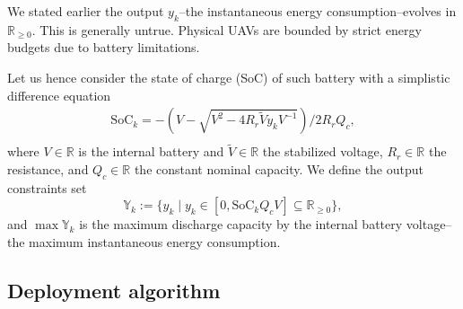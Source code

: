 \documentclass[letterpaper,10pt,conference]{ieeeconf}
\newcommand{\figpath}{./figures}
\theoremstyle{definition}
\begin{document}
We stated earlier the output $y_k$--the instantaneous energy consumption--evolves in $\mathbb{R}_{\geq 0}$. This is generally untrue. Physical UAVs are bounded by strict energy budgets due to battery limitations.

Let us hence consider the state of charge (SoC) of such battery with a simplistic difference equation~\cite{seewald2020mechanical}
\begin{equation}\begin{split}
  \mathrm{SoC}_k=-\left(V-
  \sqrt{
    V^2-
    4R_r\tilde{V}y_kV^{-1}}
  \right)/2R_rQ_c,\\ 
\end{split}\end{equation}
where $V\in\mathbb{R}$ is the internal battery and $\tilde{V}\in\mathbb{R}$ the stabilized voltage, $R_r\in\mathbb{R}$ the resistance, and $Q_c\in\mathbb{R}$ the constant nominal capacity. We define the output constraints set
\begin{equation}
  \mathbb{Y}_k:=\{y_k\mid y_k\in[0,\mathrm{SoC}_kQ_cV]\subseteq{\mathbb{R}_{\geq 0}}\},
\end{equation}
and $\max{\mathbb{Y}}_k$ is the maximum discharge capacity by the internal battery voltage--the maximum instantaneous energy consumption.

\begin{figure*}[h]
  \centering
  \hspace{-5ex}\subfigure[.]
  {
    
    \label{fig:energy-max}
  }
  \subfigure[.]
  {
    
    \label{fig:energy-max}
  }
  \caption{.}
\end{figure*}

\subsection{Deployment algorithm}
\end{document}
